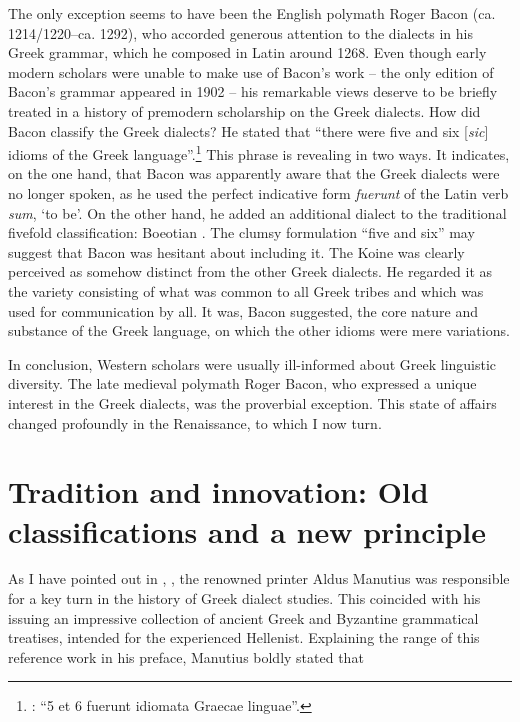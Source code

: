 {The only exception seems to have been the English polymath Roger Bacon (ca. 1214/1220–ca. 1292), who accorded generous attention to the dialects in his Greek grammar, which he composed in Latin around 1268. Even though early modern scholars were unable to make use of Bacon’s work – the only edition of Bacon’s grammar appeared in 1902 – his remarkable views deserve to be briefly treated in a history of premodern scholarship on the Greek dialects. How did Bacon classify the Greek dialects? He stated that “there were five and six [\textit{sic}] idioms of the Greek language”.\footnote{\citet[26]{Bacon1902}: “5 et 6 fuerunt idiomata Graecae linguae”.} This phrase is revealing in two ways. It indicates, on the one hand, that Bacon was apparently aware that the Greek dialects were no longer spoken, as he used the perfect indicative form \textit{fuerunt} of the Latin verb \textit{sum}, ‘to be’. On the other hand, he added an additional dialect to the traditional fivefold classification: Boeotian \citep[27]{Bacon1902}. The clumsy formulation “five and six” may suggest that Bacon was hesitant about including it. The Koine was clearly perceived as somehow distinct from the other Greek dialects. He regarded it as the variety consisting of what was common to all Greek tribes and which was used for communication by all. It was, Bacon suggested, the core nature and substance of the Greek language, on which the other idioms were mere variations.

In conclusion, Western scholars were usually ill-informed about Greek linguistic diversity. The late medieval polymath Roger Bacon, who expressed a unique interest in the Greek dialects, was the proverbial exception. This state of affairs changed profoundly in the Renaissance, to which I now turn.

\section{Tradition and innovation: Old classifications and a new principle}\label{sec:2.6}

As I have pointed out in , , the renowned printer Aldus Manutius was responsible for a key turn in the history of Greek dialect studies. This coincided with his issuing an impressive collection of ancient Greek and Byzantine grammatical treatises, intended for the experienced Hellenist. Explaining the range of this reference work in his preface, Manutius boldly stated that

}
